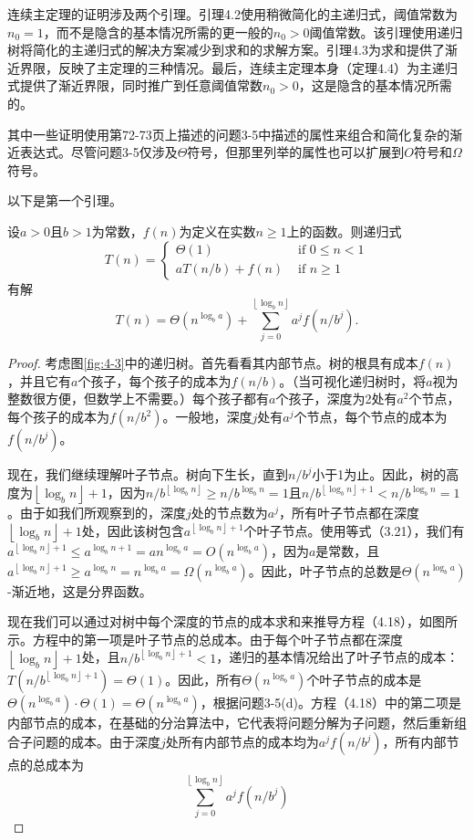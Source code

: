 \documentclass[lang=cn,newtx,10pt,scheme=chinese]{elegantbook}
\begin{document}
连续主定理的证明涉及两个引理。引理4.2使用稍微简化的主递归式，阈值常数为$n_0=1$，而不是隐含的基本情况所需的更一般的$n_0>0$阈值常数。该引理使用递归树将简化的主递归式的解决方案减少到求和的求解方案。引理4.3为求和提供了渐近界限，反映了主定理的三种情况。最后，连续主定理本身（定理4.4）为主递归式提供了渐近界限，同时推广到任意阈值常数$n_0>0$，这是隐含的基本情况所需的。

其中一些证明使用第72-73页上描述的问题3-5中描述的属性来组合和简化复杂的渐近表达式。尽管问题3-5仅涉及$\Theta$符号，但那里列举的属性也可以扩展到$O$符号和$\Omega$符号。

以下是第一个引理。

\begin{lemma}{}{}
设$a>0$且$b>1$为常数，$f(n)$为定义在实数$n \geq 1$上的函数。则递归式
$$
T(n)= \begin{cases}\Theta(1) & \text { if } 0 \leq n<1 \\ a T(n / b)+f(n) & \text { if } n \geq 1\end{cases}
$$
有解
$$
T(n)=\Theta\left(n^{\log _b a}\right)+\sum_{j=0}^{\left\lfloor\log _b n\right\rfloor} a^j f\left(n / b^j\right) .
$$
\end{lemma}

\begin{proof}
考虑图\ref{fig:4-3}中的递归树。首先看看其内部节点。树的根具有成本$f(n)$，并且它有$a$个孩子，每个孩子的成本为$f(n/b)$。（当可视化递归树时，将$a$视为整数很方便，但数学上不需要。）每个孩子都有$a$个孩子，深度为2处有$a^2$个节点，每个孩子的成本为$f\left(n/b^2\right)$。一般地，深度$j$处有$a^j$个节点，每个节点的成本为$f\left(n/b^j\right)$。

现在，我们继续理解叶子节点。树向下生长，直到$n / b^j$小于1为止。因此，树的高度为$\left\lfloor\log _b n\right\rfloor+1$，因为$n / b^{\left\lfloor\log _b n\right\rfloor} \geq n / b^{\log _b n}=1$且$n / b^{\left\lfloor\log _b n\right\rfloor+1}<n / b^{\log _b n}=1$。由于如我们所观察到的，深度$j$处的节点数为$a^j$，所有叶子节点都在深度$\left\lfloor\log _b n\right\rfloor+1$处，因此该树包含$a^{\left\lfloor\log _b n\right\rfloor+1}$个叶子节点。使用等式（3.21），我们有$a^{\left\lfloor\log _b n\right\rfloor+1} \leq a^{\log _b n+1}=a n^{\log _b a}=O\left(n^{\log _b a}\right)$，因为$a$是常数，且$a^{\left\lfloor\log _b n\right\rfloor+1} \geq a^{\log _b n}=n^{\log _b a}=\Omega\left(n^{\log _b a}\right)$。因此，叶子节点的总数是$\Theta\left(n^{\log _b a}\right)$-渐近地，这是分界函数。

现在我们可以通过对树中每个深度的节点的成本求和来推导方程（4.18），如图所示。方程中的第一项是叶子节点的总成本。由于每个叶子节点都在深度$\left\lfloor\log _b n\right\rfloor+1$处，且$n / b^{\left\lfloor\log _b n\right\rfloor+1}<1$，递归的基本情况给出了叶子节点的成本：$T\left(n / b^{\left\lfloor\log _b n\right\rfloor+1}\right)=\Theta(1)$。因此，所有$\Theta\left(n^{\log _b a}\right)$个叶子节点的成本是$\Theta\left(n^{\log _b a}\right) \cdot \Theta(1)=\Theta\left(n^{\log _b a}\right)$，根据问题3-5(d)。方程（4.18）中的第二项是内部节点的成本，在基础的分治算法中，它代表将问题分解为子问题，然后重新组合子问题的成本。由于深度$j$处所有内部节点的成本均为$a^j f\left(n / b^j\right)$，所有内部节点的总成本为
$$
\sum_{j=0}^{\left\lfloor\log _b n\right\rfloor} a^j f\left(n / b^j\right)
$$
\end{proof}
\end{document}
